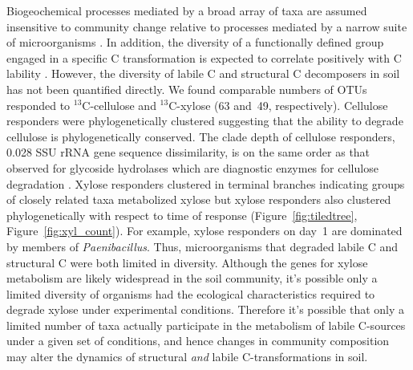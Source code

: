 \documentclass{article}
\begin{document}
Biogeochemical processes mediated by a broad array of taxa are assumed
insensitive to community change relative to
processes mediated by a narrow suite of microorganisms
\citep{Schimel_1995,McGuire2010}. In addition, the diversity of
a functionally defined group engaged in a specific C transformation is
expected to correlate positively with C lability \citep{McGuire2010}.
However, the diversity of labile C and structural C decomposers in soil
has not been quantified directly. We found comparable numbers of OTUs
responded to $^{13}$C-cellulose and $^{13}$C-xylose (63 and~49,
respectively). Cellulose responders were phylogenetically clustered
suggesting that the ability to degrade cellulose is phylogenetically
conserved. The clade depth of cellulose responders, 0.028 SSU rRNA gene
sequence dissimilarity, is on the same order as that observed for
glycoside hydrolases which are diagnostic enzymes for cellulose
degradation \citep{Berlemont2013}. Xylose responders clustered in terminal
branches indicating groups of closely related taxa metabolized xylose but
xylose responders also clustered phylogenetically with respect to time of
response (Figure~\ref{fig:tiledtree}, Figure~\ref{fig:xyl_count}).
For example, xylose responders on day~1 are dominated by members of
\textit{Paenibacillus}. Thus, microorganisms that degraded labile C and
structural C were both limited in diversity. Although the genes for xylose
metabolism are likely widespread in the soil community, it's possible only
a limited diversity of organisms had the ecological characteristics
required to degrade xylose under experimental conditions. Therefore it's
possible that only a limited number of taxa actually participate in the
metabolism of labile C-sources under a given set of conditions, and hence
changes in community composition may alter the dynamics of structural
\textit{and} labile C-transformations in soil.
\end{document}
